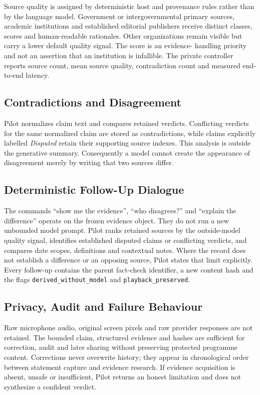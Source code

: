 Source quality is assigned by deterministic host and provenance rules rather
than by the language model.  Government or intergovernmental primary sources,
academic institutions and established editorial publishers receive distinct
classes, scores and human-readable rationales.  Other organizations remain
visible but carry a lower default quality signal.  The score is an evidence-
handling priority and not an assertion that an institution is infallible.  The
private controller reports source count, mean source quality, contradiction
count and measured end-to-end latency.

\subsection{Contradictions and Disagreement}

Pilot normalizes claim text and compares retained verdicts.  Conflicting
verdicts for the same normalized claim are stored as contradictions, while
claims explicitly labelled \emph{Disputed} retain their supporting source
indexes.  This analysis is outside the generative summary.  Consequently a
model cannot create the appearance of disagreement merely by writing that two
sources differ.

\subsection{Deterministic Follow-Up Dialogue}

The commands ``show me the evidence'', ``who disagrees?'' and ``explain the
difference'' operate on the frozen evidence object.  They do not run a new
unbounded model prompt.  Pilot ranks retained sources by the outside-model
quality signal, identifies established disputed claims or conflicting verdicts,
and compares date scopes, definitions and contextual notes.  Where the record
does not establish a difference or an opposing source, Pilot states that limit
explicitly.  Every follow-up contains the parent fact-check identifier, a new
content hash and the flags \texttt{derived\_without\_model} and
\texttt{playback\_preserved}.

\subsection{Privacy, Audit and Failure Behaviour}

Raw microphone audio, original screen pixels and raw provider responses are not
retained.  The bounded claim, structured evidence and hashes are sufficient for
correction, audit and later sharing without preserving protected programme
content.  Corrections never overwrite history; they appear in chronological
order between statement capture and evidence research.  If evidence acquisition
is absent, unsafe or insufficient, Pilot returns an honest limitation and does
not synthesize a confident verdict.

